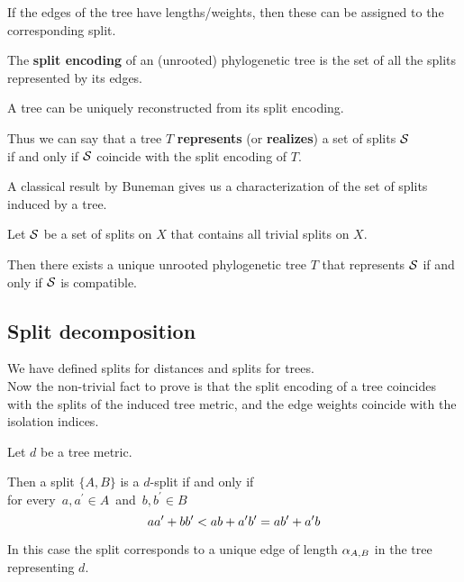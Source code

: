\documentclass[./main.tex]{subfiles}
\begin{document}
If the edges of the tree have lengths/weights, then these can be assigned to the corresponding split.

The \textbf{split encoding} of an (unrooted) phylogenetic tree is the set of all the splits represented by its edges.

\begin{figure}[h]
    \centering
\end{figure}

\begin{remarklike}[Fact]
    A tree can be uniquely reconstructed from its split encoding.
\end{remarklike}

Thus we can say that a tree $T$ \textbf{represents} (or \textbf{realizes}) a set of splits ${\mathcal{S}}$ \\
\bsp if and only if ${\mathcal{S}}$ coincide with the split encoding of $T$.\bigskip

A classical result by Buneman \cite{Bun72} gives us a characterization of the set of splits induced by a tree.

\begin{remarklike}[Fact]
    Let ${\mathcal{S}}$ be a set of splits on $X$ that contains all trivial splits on $X$.
    
    Then there exists a unique unrooted phylogenetic tree $T$ that represents ${\mathcal{S}}$ if and only if ${\mathcal{S}}$ is compatible.
\end{remarklike}

\clearpage


\subsection*{Split decomposition}

We have defined splits for distances and splits for trees. \\
Now the non-trivial fact to prove is that the split encoding of a tree coincides with the splits of the induced tree metric, and the edge weights coincide with the isolation indices.

\begin{fact}
    Let $d$ be a tree metric. 
    
    Then a split $\{A,B\}$ is a $d$-split if and only if \\[2pt]
    for every $\, a,a^\prime \in A \,$ and $\, b,b^\prime \in B \,$
    \[ a a^\prime + b b^\prime < a b + a^\prime b^\prime = a b^\prime + a^\prime b \nospblw \]

    In this case the split corresponds to a unique edge of length $\alpha_{A,B}$ in the tree representing $d$.
\end{fact}
\end{document}
